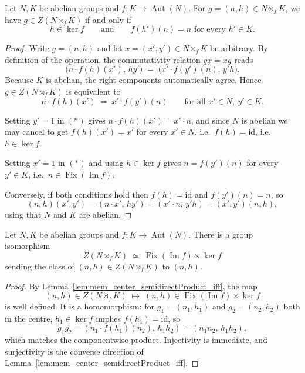 \begin{lemma}\label{lem:mem_center_semidirectProduct_iff}
\leanok
Let $N, K$ be abelian groups and $f : K \to \operatorname{Aut}(N)$. For
$g = (n, h) \in N\rtimes_f K$, we have $g \in Z(N\rtimes_f K)$ if and only if
\[
  h \in \ker f
  \qquad\text{and}\qquad
  f(h')(n) = n \text{ for every } h' \in K.
\]
\end{lemma}
\begin{proof}
Write $g = (n, h)$ and let $x = (x', y') \in N\rtimes_f K$ be arbitrary. By
definition of the operation, the commutativity relation $g x = x g$ reads
\[
  \bigl(n\cdot f(h)(x'),\, h y'\bigr)
  \;=\; \bigl(x'\cdot f(y')(n),\, y' h\bigr).
\]
Because $K$ is abelian, the right components automatically agree. Hence
$g\in Z(N\rtimes_f K)$ is equivalent to
\[
  n\cdot f(h)(x') \;=\; x' \cdot f(y')(n)
  \qquad \text{for all } x' \in N,\ y' \in K. \tag{$\ast$}
\]

Setting $y' = 1$ in $(\ast)$ gives $n\cdot f(h)(x') = x' \cdot n$, and since $N$
is abelian we may cancel to get $f(h)(x') = x'$ for every $x' \in N$, i.e.\
$f(h) = \mathrm{id}$, i.e.\ $h \in \ker f$.

Setting $x' = 1$ in $(\ast)$ and using $h \in \ker f$ gives $n = f(y')(n)$ for
every $y' \in K$, i.e.\ $n \in \operatorname{Fix}(\operatorname{Im} f)$.

Conversely, if both conditions hold then $f(h) = \mathrm{id}$ and
$f(y')(n) = n$, so
\[
  (n, h)(x', y') = (n\cdot x',\, h y')
  = (x'\cdot n,\, y' h) = (x', y')(n, h),
\]
using that $N$ and $K$ are abelian.
\end{proof}

\begin{lemma}\label{lem:center_semidirectProduct_iso}
\leanok
Let $N, K$ be abelian groups and $f : K \to \operatorname{Aut}(N)$. There is a
group isomorphism
\[
  Z(N\rtimes_f K) \;\simeq\; \operatorname{Fix}(\operatorname{Im} f) \times \ker f
\]
sending the class of $(n, h) \in Z(N\rtimes_f K)$ to $(n, h)$.
\end{lemma}
\begin{proof}
By Lemma~\ref{lem:mem_center_semidirectProduct_iff}, the map
\[
  (n, h) \in Z(N\rtimes_f K) \;\longmapsto\; (n, h) \in
  \operatorname{Fix}(\operatorname{Im} f) \times \ker f
\]
is well defined. It is a homomorphism: for $g_1 = (n_1, h_1)$ and
$g_2 = (n_2, h_2)$ both in the centre, $h_1 \in \ker f$ implies
$f(h_1) = \mathrm{id}$, so
\[
  g_1 g_2 = (n_1 \cdot f(h_1)(n_2),\, h_1 h_2) = (n_1 n_2,\, h_1 h_2),
\]
which matches the componentwise product. Injectivity is immediate, and
surjectivity is the converse direction of
Lemma~\ref{lem:mem_center_semidirectProduct_iff}.
\end{proof}


